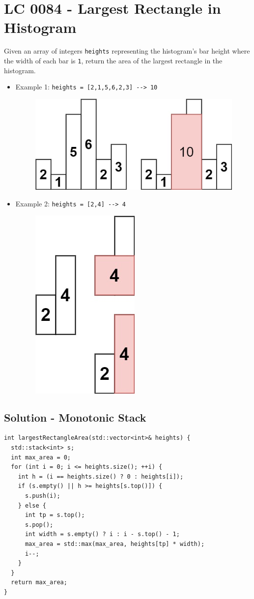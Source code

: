 \section{LC 0084 - Largest Rectangle in Histogram}
Given an array of integers {\colorbox{CodeBackground}{\lstinline|heights|}} representing the histogram's bar height where the width of each bar is {\colorbox{CodeBackground}{\lstinline|1|}}, return the area of the largest rectangle in the histogram.

\begin{itemize}
\item Example 1: {\colorbox{CodeBackground}{\lstinline|heights = [2,1,5,6,2,3] --> 10|}}
\begin{figure}[H]
\centering
\includegraphics[width=0.3\linewidth]{images/lc0084_eg1}
\label{fig:lc0084eg1}
\end{figure}
\item Example 2: {\colorbox{CodeBackground}{\lstinline|heights = [2,4] --> 4|}}
\begin{figure}[H]
\centering
\includegraphics[width=0.11\linewidth]{images/lc0084_eg2}
\label{fig:lc0084eg2}
\end{figure}
\end{itemize}

\subsection*{Solution - Monotonic Stack}
\begin{lstlisting}
int largestRectangleArea(std::vector<int>& heights) {
  std::stack<int> s;
  int max_area = 0;
  for (int i = 0; i <= heights.size(); ++i) {
    int h = (i == heights.size() ? 0 : heights[i]);
    if (s.empty() || h >= heights[s.top()]) {
      s.push(i);
    } else {
      int tp = s.top();
      s.pop();
      int width = s.empty() ? i : i - s.top() - 1;
      max_area = std::max(max_area, heights[tp] * width);
      i--;
    }
  }
  return max_area;
}
\end{lstlisting}